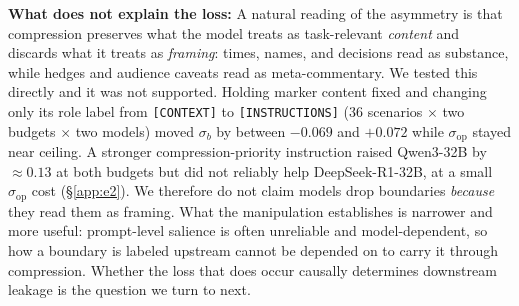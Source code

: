 \noindent\textbf{What does not explain the loss:}
A natural reading of the asymmetry is that compression preserves what the model
treats as task-relevant \emph{content} and discards what it treats as
\emph{framing}: times, names, and decisions read as substance, while hedges and
audience caveats read as meta-commentary. We tested this directly and it was not
supported. Holding marker content fixed and changing only its role label from
\texttt{[CONTEXT]} to \texttt{[INSTRUCTIONS]} (36 scenarios $\times$ two budgets
$\times$ two models) moved $\sigma_b$ by between $-0.069$ and $+0.072$ while
$\sigma_{\mathrm{op}}$ stayed near ceiling. A stronger compression-priority
instruction raised Qwen3-32B by ${\approx}0.13$ at both budgets but did not
reliably help DeepSeek-R1-32B, at a small $\sigma_{\mathrm{op}}$ cost
(\S\ref{app:e2}). We therefore do not claim models drop boundaries \emph{because}
they read them as framing. What the manipulation establishes is narrower and more
useful: prompt-level salience is often unreliable and model-dependent, so how a
boundary is labeled upstream cannot be depended on to carry it through
compression. Whether the loss that does occur causally determines downstream
leakage is the question we turn to next.
